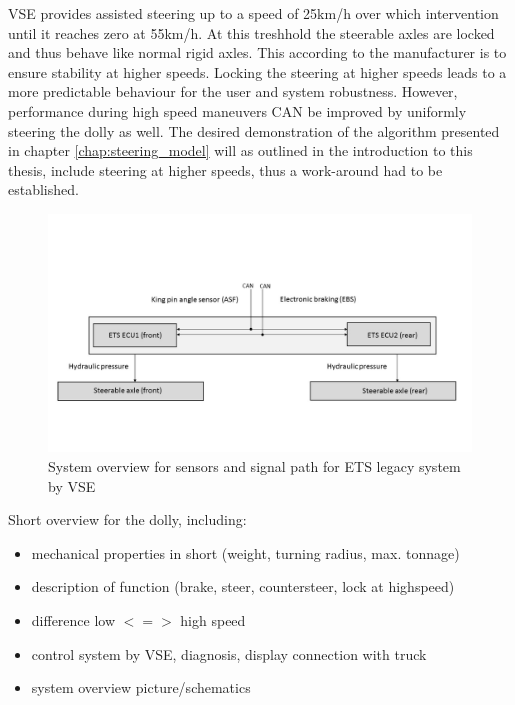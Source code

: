 \documentclass[ExampleMasters.tex]{subfiles}
\begin{document}
VSE provides assisted steering up to a speed of 25km/h over which intervention until it reaches zero at 55km/h. At this treshhold the steerable axles are locked and thus behave like normal rigid axles. This according to the manufacturer is to ensure stability at higher speeds.\cite{dolly_datasheet} Locking the steering at higher speeds leads to a more predictable behaviour for the user and system robustness. However, performance during high speed maneuvers \gls{CAN} be improved by uniformly steering the dolly as well.\cite{performance_improvement} The desired demonstration of the algorithm presented in chapter \ref{chap:steering_model} will as outlined in the introduction to this thesis, include steering at higher speeds, thus a work-around had to be established.\\



\begin{figure}[!htb]
\centering
\includegraphics[width=1\linewidth]{figures/system_overview_ETS}

\caption{System overview for sensors and signal path for \gls{ETS} legacy system by VSE}
\label{fig:system_overview_ETS}
\end{figure}




Short overview for the dolly, including: 

\begin{itemize}
\item mechanical properties in short (weight, turning radius, max. tonnage)
\item description of function (brake, steer, countersteer, lock at highspeed)
\item difference low $<=>$ high speed
\item control system by VSE, diagnosis, display connection with truck
\item system overview picture/schematics

\end{itemize}
\end{document}
